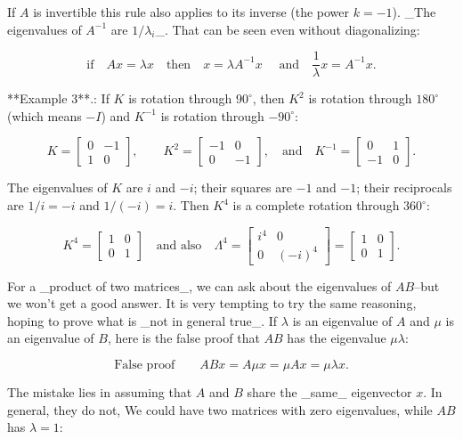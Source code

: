 If \(A\) is invertible this rule also applies to its inverse (the power \(k=-1\)). _The eigenvalues of \(A^{-1}\) are \(1/\lambda_{i}\)_. That can be seen even without diagonalizing:

\[\text{if}\quad Ax=\lambda x\quad\text{then}\quad x=\lambda A^{-1}x\quad\text{ and}\quad\frac{1}{\lambda}x=A^{-1}x.\]

**Example 3**.: If \(K\) is rotation through \(90^{\circ}\), then \(K^{2}\) is rotation through \(180^{\circ}\) (which means \(-I\)) and \(K^{-1}\) is rotation through \(-90^{\circ}\):

\[K=\begin{bmatrix}0&-1\\ 1&0\end{bmatrix},\qquad K^{2}=\begin{bmatrix}-1&0\\ 0&-1\end{bmatrix},\quad\text{and}\quad K^{-1}=\begin{bmatrix}0&1\\ -1&0\end{bmatrix}.\]

The eigenvalues of \(K\) are \(i\) and \(-i\); their squares are \(-1\) and \(-1\); their reciprocals are \(1/i=-i\) and \(1/(-i)=i\). Then \(K^{4}\) is a complete rotation through \(360^{\circ}\):

\[K^{4}=\begin{bmatrix}1&0\\ 0&1\end{bmatrix}\quad\text{and also}\quad\Lambda^{4}=\begin{bmatrix}i^{4}&0 \\ 0&(-i)^{4}\end{bmatrix}=\begin{bmatrix}1&0\\ 0&1\end{bmatrix}.\]

For a _product of two matrices_, we can ask about the eigenvalues of \(AB\)--but we won't get a good answer. It is very tempting to try the same reasoning, hoping to prove what is _not in general true_. If \(\lambda\) is an eigenvalue of \(A\) and \(\mu\) is an eigenvalue of \(B\), here is the false proof that \(AB\) has the eigenvalue \(\mu\lambda\):

\[\text{{False proof}}\qquad ABx=A\mu x=\mu Ax=\mu\lambda x.\]

The mistake lies in assuming that \(A\) and \(B\) share the _same_ eigenvector \(x\). In general, they do not, We could have two matrices with zero eigenvalues, while \(AB\) has \(\lambda=1\):

